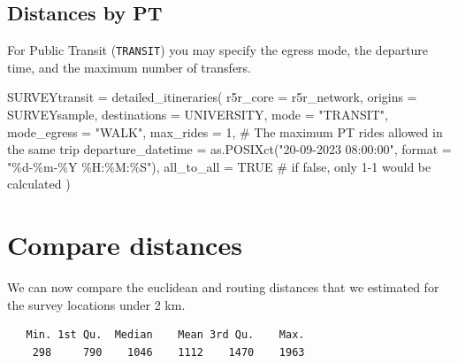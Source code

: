 \documentclass[
  letterpaper,
  DIV=11,
  numbers=noendperiod]{scrreprt}
\newenvironment{Shaded}{\begin{snugshade}}{\end{snugshade}}
\newcommand{\AttributeTok}[1]{\textcolor[rgb]{0.40,0.45,0.13}{#1}}
\newcommand{\CommentTok}[1]{\textcolor[rgb]{0.37,0.37,0.37}{#1}}
\newcommand{\ConstantTok}[1]{\textcolor[rgb]{0.56,0.35,0.01}{#1}}
\newcommand{\DecValTok}[1]{\textcolor[rgb]{0.68,0.00,0.00}{#1}}
\newcommand{\FunctionTok}[1]{\textcolor[rgb]{0.28,0.35,0.67}{#1}}
\newcommand{\NormalTok}[1]{\textcolor[rgb]{0.00,0.23,0.31}{#1}}
\newcommand{\OtherTok}[1]{\textcolor[rgb]{0.00,0.23,0.31}{#1}}
\newcommand{\SpecialCharTok}[1]{\textcolor[rgb]{0.37,0.37,0.37}{#1}}
\newcommand{\StringTok}[1]{\textcolor[rgb]{0.13,0.47,0.30}{#1}}
\begin{document}
\subsection{Distances by PT}\label{distances-by-pt}

For Public Transit (\texttt{TRANSIT}) you may specify the egress mode,
the departure time, and the maximum number of transfers.

\begin{Shaded}
\begin{Highlighting}[]
\NormalTok{SURVEYtransit }\OtherTok{=} \FunctionTok{detailed\_itineraries}\NormalTok{(}
  \AttributeTok{r5r\_core =}\NormalTok{ r5r\_network,}
  \AttributeTok{origins =}\NormalTok{ SURVEYsample,}
  \AttributeTok{destinations =}\NormalTok{ UNIVERSITY,}
  \AttributeTok{mode =} \StringTok{"TRANSIT"}\NormalTok{,}
  \AttributeTok{mode\_egress =} \StringTok{"WALK"}\NormalTok{,}
  \AttributeTok{max\_rides =} \DecValTok{1}\NormalTok{, }\CommentTok{\# The maximum PT rides allowed in the same trip}
  \AttributeTok{departure\_datetime =}  \FunctionTok{as.POSIXct}\NormalTok{(}\StringTok{"20{-}09{-}2023 08:00:00"}\NormalTok{,}
                                 \AttributeTok{format =} \StringTok{"\%d{-}\%m{-}\%Y \%H:\%M:\%S"}\NormalTok{),}
  \AttributeTok{all\_to\_all =} \ConstantTok{TRUE} \CommentTok{\# if false, only 1{-}1 would be calculated}
\NormalTok{)}
\end{Highlighting}
\end{Shaded}

\section{Compare distances}\label{compare-distances}

We can now compare the euclidean and routing distances that we estimated
for the survey locations under 2 km.

\begin{Shaded}
\end{Shaded}

\begin{verbatim}
   Min. 1st Qu.  Median    Mean 3rd Qu.    Max. 
    298     790    1046    1112    1470    1963 
\end{verbatim}

\begin{Shaded}
\end{Shaded}
\end{document}
